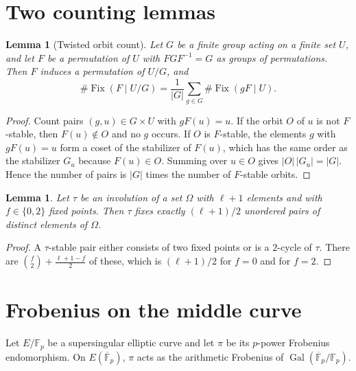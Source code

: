 \documentclass[11pt,a4paper]{article}
\newtheorem{lemma}[theorem]{Lemma}
\theoremstyle{remark}\newtheorem{remark}[theorem]{Remark}
\numberwithin{equation}{section}
\newcommand{\Fp}{\mathbb F_p}
\newcommand{\kk}{\overline{\mathbb F}_p}
\newcommand{\Fix}{\operatorname{Fix}}
\begin{document}
\section{Two counting lemmas}
\begin{lemma}[Twisted orbit count]\label{lem:twisted}
Let $G$ be a finite group acting on a finite set $U$, and let $F$ be a permutation of $U$ with $FGF^{-1}=G$ as groups of permutations. Then $F$ induces a permutation of $U/G$, and
\[
\#\Fix(F\mid U/G)=\frac1{|G|}\sum_{g\in G}\#\Fix(gF\mid U).
\]
\end{lemma}
\begin{proof}
Count pairs $(g,u)\in G\times U$ with $gF(u)=u$. If the orbit $O$ of $u$ is not $F$-stable, then $F(u)\notin O$ and no $g$ occurs. If $O$ is $F$-stable, the elements $g$ with $gF(u)=u$ form a coset of the stabilizer of $F(u)$, which has the same order as the stabilizer $G_u$ because $F(u)\in O$. Summing over $u\in O$ gives $|O|\,|G_u|=|G|$. Hence the number of pairs is $|G|$ times the number of $F$-stable orbits.
\end{proof}

\begin{lemma}\label{lem:pairs}
Let $\tau$ be an involution of a set $\Omega$ with $\ell+1$ elements and with $f\in\{0,2\}$ fixed points. Then $\tau$ fixes exactly $(\ell+1)/2$ unordered pairs of distinct elements of $\Omega$.
\end{lemma}
\begin{proof}
A $\tau$-stable pair either consists of two fixed points or is a $2$-cycle of $\tau$. There are $\binom f2+\frac{\ell+1-f}{2}$ of these, which is $(\ell+1)/2$ for $f=0$ and for $f=2$.
\end{proof}

\section{Frobenius on the middle curve}
Let $E/\Fp$ be a supersingular elliptic curve and let $\pi$ be its $p$-power Frobenius endomorphism. On $E(\kk)$, $\pi$ acts as the arithmetic Frobenius of $\operatorname{Gal}(\kk/\Fp)$.
\end{document}
